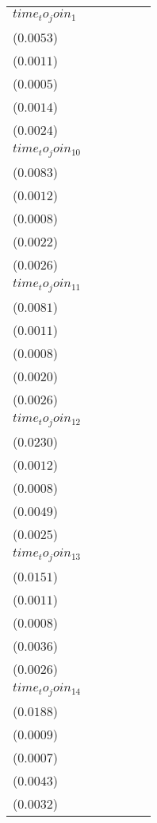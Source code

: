 \begin{tabular}{llllll}
$time_to_join_1$   &  \makecell{$-0.0044^{}$ \\ ($0.0053$)} &  \makecell{$-0.0008^{}$ \\ ($0.0011$)} &  \makecell{$-0.0004^{}$ \\ ($0.0005$)} &  \makecell{$-0.0007^{}$ \\ ($0.0014$)} &   \makecell{$0.0019^{}$ \\ ($0.0024$)} \\
$time_to_join_10$  &   \makecell{$0.0110^{}$ \\ ($0.0083$)} &  \makecell{$-0.0006^{}$ \\ ($0.0012$)} &  \makecell{$-0.0005^{}$ \\ ($0.0008$)} &   \makecell{$0.0032^{}$ \\ ($0.0022$)} &   \makecell{$0.0022^{}$ \\ ($0.0026$)} \\
$time_to_join_11$  &   \makecell{$0.0042^{}$ \\ ($0.0081$)} &  \makecell{$-0.0008^{}$ \\ ($0.0011$)} &  \makecell{$-0.0006^{}$ \\ ($0.0008$)} &   \makecell{$0.0016^{}$ \\ ($0.0020$)} &   \makecell{$0.0021^{}$ \\ ($0.0026$)} \\
$time_to_join_12$  &   \makecell{$0.0240^{}$ \\ ($0.0230$)} &  \makecell{$-0.0008^{}$ \\ ($0.0012$)} &  \makecell{$-0.0006^{}$ \\ ($0.0008$)} &   \makecell{$0.0057^{}$ \\ ($0.0049$)} &   \makecell{$0.0020^{}$ \\ ($0.0025$)} \\
$time_to_join_13$  &   \makecell{$0.0228^{}$ \\ ($0.0151$)} &  \makecell{$-0.0005^{}$ \\ ($0.0011$)} &  \makecell{$-0.0005^{}$ \\ ($0.0008$)} &  \makecell{$0.0062^{*}$ \\ ($0.0036$)} &   \makecell{$0.0020^{}$ \\ ($0.0026$)} \\
$time_to_join_14$  &   \makecell{$0.0266^{}$ \\ ($0.0188$)} &  \makecell{$-0.0004^{}$ \\ ($0.0009$)} &  \makecell{$-0.0004^{}$ \\ ($0.0007$)} &   \makecell{$0.0065^{}$ \\ ($0.0043$)} &   \makecell{$0.0014^{}$ \\ ($0.0032$)} \\

\end{tabular}
